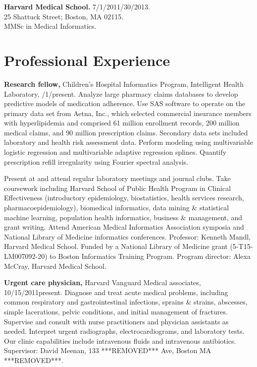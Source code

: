 \documentclass[12pt]{article}
\begin{document}
\textbf{Harvard Medical School.} 7/1/2011/30/2013.\\
25 Shattuck Street; Boston, MA 02115.\\
MMSc in Medical Informatics.

\newpage

\section*{Professional Experience} %

\textbf{Research fellow,} Children’s Hospital Informatics Program,
Intelligent Health Lab\-o\-ra\-to\-ry,
/1/\ndash{}\linebreak[0]pres\-ent.
Analyze large pharmacy claims databases to develop predictive models
of medication adherence. Use SAS software to operate on the primary
data set from Aetna, Inc., which selected commercial insurance members
with hyperlipidemia and comprised 61 million enrollment records, 200
million medical claims, and 90 million prescription claims. Secondary
data sets included laboratory and health risk assessment data. Perform
modeling using multivariable logistic regression and multivariable
adaptive regression splines. Quantify prescription refill irregularity
using Fourier spectral analysis.

Present at and attend regular laboratory meetings and journal clubs.
Take coursework including Harvard School of Public Health Program in
Clinical Effectiveness (introductory epidemiology, biostatistics,
health services research, pharmacoepidemiology), biomedical
informatics, data mining \& statistical machine learning, population
health informatics, business \& management, and grant writing. Attend
American Medical Informatics Association symposia and National Library
of Medicine informatics conferences. Professor: Kenneth Mandl, Harvard
Medical School. Funded by a National Library of Medicine grant
(5-T15-LM007092-20) to Boston Informatics Training Program. Program
director: Alexa McCray, Harvard Medical School.

\textbf{Urgent care physician,} Harvard Vanguard Medical associates,
10/15/2011\ndash{}present. Diagnose and treat acute medical problems,
including common respiratory and gastrointestinal infections, sprains
\& strains, abscesses, simple lacerations, pelvic conditions, and
initial management of fractures. Supervise and consult with nurse
practitioners and physician assistants as needed. Interpret urgent
radiographs, electrocardiograms, and laboratory tests. Our clinic
capabilities include intravenous fluids and intravenous antibiotics.
Supervisor: David Meenan, 133 ***REMOVED*** Ave, Boston MA ***REMOVED***.
\end{document}
